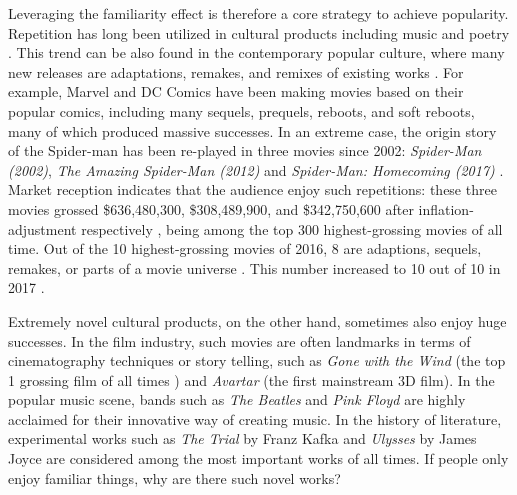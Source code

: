 \documentclass[letterpaper]{article} %
\begin{document}
Leveraging the familiarity effect is therefore a core strategy to achieve popularity. Repetition has long been utilized in cultural products including music and poetry \cite{huron2013psychological}. This trend can be also found in the contemporary popular culture, where many new releases are adaptations, remakes, and remixes of existing works \cite{manovich2007comes}. For example, Marvel and DC Comics have been making movies based on their popular comics, including many sequels, prequels, reboots, and soft reboots, many of which produced massive successes. In an extreme case, the origin story of the Spider-man has been re-played in three movies since 2002: \emph{Spider-Man (2002)}, \emph{The Amazing Spider-Man (2012)} and \emph{Spider-Man: Homecoming (2017)} \cite{spiderman}. Market reception indicates that the audience enjoy such repetitions: these three movies grossed \$636,480,300, \$308,489,900, and \$342,750,600 after inflation-adjustment respectively \cite{spider-gross}, being among the top 300 highest-grossing movies of all time. Out of the 10 highest-grossing movies of 2016, 8 are adaptions, sequels, remakes, or parts of a movie universe \cite{2016film}. This number increased to 10 out of 10 in 2017 \cite{2017film}. 

Extremely novel cultural products, on the other hand, sometimes also enjoy huge successes. In the film industry, such movies are often landmarks in terms of cinematography techniques or story telling, such as \emph{Gone with the Wind} (the top 1 grossing film of all times \cite{spider-gross}) and \emph{Avartar} (the first mainstream 3D film). In the popular music scene, bands such as \emph{The Beatles} and \emph{Pink Floyd} are highly acclaimed for their innovative way of creating music. In the history of literature, experimental works such as \emph{The Trial} by Franz Kafka and \emph{Ulysses} by James Joyce are considered among the most important works of all times. If people only enjoy familiar things, why are there such novel works?
\end{document}

